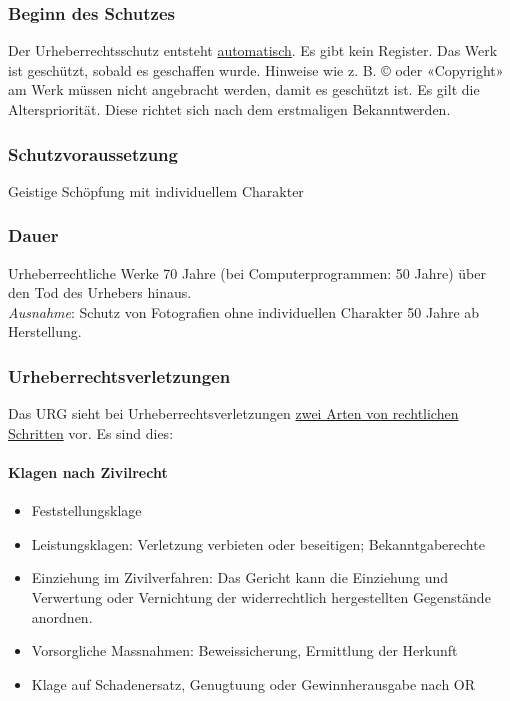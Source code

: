 \subsubsection{Beginn des Schutzes}
Der Urheberrechtsschutz entsteht \underline{automatisch}. Es gibt kein Register. Das Werk ist geschützt, sobald es geschaffen wurde. Hinweise wie z. B. © oder «Copyright» am Werk müssen nicht angebracht werden, damit es geschützt ist. Es gilt die Alterspriorität. Diese richtet sich nach dem erstmaligen Bekanntwerden.

\subsubsection{Schutzvoraussetzung}
Geistige Schöpfung mit individuellem Charakter

\subsubsection{Dauer}
Urheberrechtliche Werke 70 Jahre (bei Computerprogrammen: 50 Jahre) über den Tod des Urhebers hinaus. \\
\textit{Ausnahme}: Schutz von Fotografien ohne individuellen Charakter 50 Jahre ab Herstellung.

\subsubsection{Urheberrechtsverletzungen}
Das URG sieht bei Urheberrechtsverletzungen \underline{zwei Arten von rechtlichen Schritten} vor. Es sind dies:

\paragraph{Klagen nach Zivilrecht}
\begin{itemize}
    \item Feststellungsklage
    \item Leistungsklagen: Verletzung verbieten oder beseitigen; Bekanntgaberechte
    \item Einziehung im Zivilverfahren: Das Gericht kann die Einziehung und Verwertung oder Vernichtung der widerrechtlich hergestellten Gegenstände anordnen.
    \item Vorsorgliche Massnahmen: Beweissicherung, Ermittlung der Herkunft
    \item Klage auf Schadenersatz, Genugtuung oder Gewinnherausgabe nach OR
\end{itemize}

